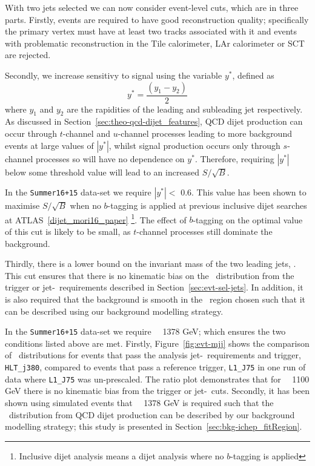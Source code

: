 With two jets selected we can now consider event-level cuts,
which are in three parts.
Firstly, events are required to have good reconstruction quality;
specifically the primary vertex must have at least two tracks associated with it
and events with problematic reconstruction in the Tile calorimeter, LAr calorimeter or SCT are rejected.

\noindent
Secondly, we increase sensitivy to signal using the 
variable $y^*$, defined as
\begin{equation}
  y^* = \frac{(y_1-y_2)}{2}
\end{equation}
where $y_1$ and $y_2$ are the rapidities of the leading and subleading jet respectively.
As discussed in Section~\ref{sec:theo-qcd-dijet_features}, QCD dijet production can occur through $t$-channel and $u$-channel processes leading to more background events at large values of $|y^*|$,
whilst signal production occurs only through $s$-channel processes so will have no dependence on $y^*$.
Therefore, requiring $|y^*|$ below some threshold value will lead to an increased $S/\sqrt{B}$.

In the \verb|Summer16+15| data-set we require $|y^*| <$ 0.6.
This value has been shown to maximise $S/\sqrt{B}$ when no $b$-tagging is applied
at previous inclusive dijet searches at ATLAS~\ref{dijet_mori16_paper}
\footnote{Inclusive dijet analysis means a dijet analysis where no $b$-tagging is applied}.
The effect of $b$-tagging on the optimal value of this cut is likely to be small,
as $t$-channel processes still dominate the background.

Thirdly, there is a lower bound on the invariant mass of the two leading jets, \mjj.
This cut ensures that there is no kinematic bias on the \mjj~distribution
from the trigger or jet-\pT~requirements described in Section~\ref{sec:evt-sel-jets}.
In addition, it is also required that the background is smooth in the \mjj~region chosen
such that it can be described using our background modelling strategy.

In the \verb|Summer16+15| data-set we require \mjj~\gt~1378 GeV;
which ensures the two conditions listed above are met.
Firstly, Figure~\ref{fig:evt-mjj} shows the comparison of \mjj~distributions for events
that pass the analysis jet-\pT~requirements and  trigger, \verb|HLT_j380|, compared to events that pass a reference trigger, \verb|L1_J75|
in one run of data where \verb|L1_J75| was un-prescaled.
The ratio plot demonstrates that for \mjj~\gt~1100 GeV there is no kinematic bias from the trigger or jet-\pT~cuts.
Secondly, it has been shown using simulated events that
\mjj~\gt~1378 GeV is required such that the \mjj~distribution from QCD dijet production
can be described by our background modelling strategy;
this study is presented in Section~\ref{sec:bkg-ichep_fitRegion}.

